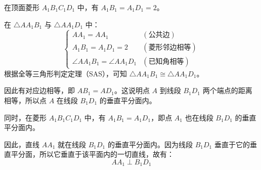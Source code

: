 \documentclass[11pt,a4paper]{ctexart}
\begin{document}
\begin{proof*}[第（1）问：证明 $AA_1 \perp B_1D_1$]
在顶面菱形 $A_1B_1C_1D_1$ 中，有 $A_1B_1 = A_1D_1 = 2$。\par
在 $\triangle AA_1B_1$ 与 $\triangle AA_1D_1$ 中：
\[
\begin{cases}
    AA_1 = AA_1 & (\text{公共边}) \\
    A_1B_1 = A_1D_1 = 2 & (\text{菱形邻边相等}) \\
    \angle AA_1B_1 = \angle AA_1D_1 & (\text{已知角相等})
\end{cases}
\]
根据全等三角形判定定理（SAS），可知 $\triangle AA_1B_1 \cong \triangle AA_1D_1$。\par
因此有对应边相等，即 $AB_1 = AD_1$。这说明点 $A$ 到线段 $B_1D_1$ 两个端点的距离相等，所以点 $A$ 在线段 $B_1D_1$ 的垂直平分面内。\par
同时，在菱形 $A_1B_1C_1D_1$ 中，有 $A_1B_1 = A_1D_1$，即点 $A_1$ 也在线段 $B_1D_1$ 的垂直平分面内。\par
因此，直线 $AA_1$ 就在线段 $B_1D_1$ 的垂直平分面内。因为线段 $B_1D_1$ 垂直于它的垂直平分面，所以它垂直于该平面内的一切直线，故有：
\[ \boxed{AA_1 \perp B_1D_1} \]
\end{proof*}
\end{document}
